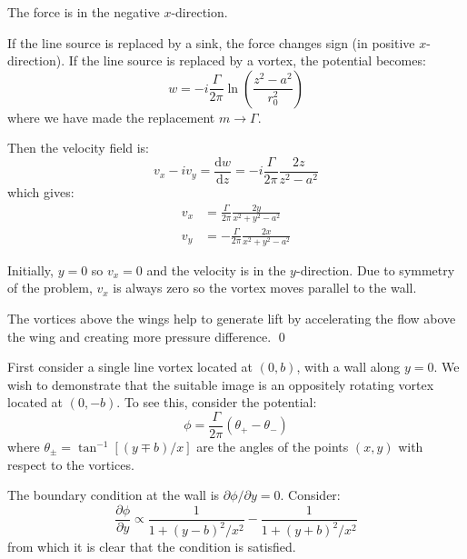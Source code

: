 \documentclass[12pt]{article}
\begin{document}
The force is in the negative $x$-direction.

If the line source is replaced by a sink, the force changes sign (in positive $x$-direction). If the line source is replaced by a vortex, the potential becomes:
\begin{equation}
    w = -i \frac{\Gamma}{2\pi} \ln{\left( \frac{z^{2} - a^{2}}{r_{0}^{2}} \right)}
\end{equation}
where we have made the replacement $m \to \Gamma$.

Then the velocity field is:
\begin{equation}
    v_{x} - iv_{y} = \frac{\mathrm{d}w}{\mathrm{d}z} = -i \frac{\Gamma}{2\pi} \frac{2z}{z^{2} - a^{2}}
\end{equation}
which gives:
\begin{equation}
    \begin{split}
        v_{x} &= \frac{\Gamma}{2\pi} \frac{2y}{x^{2} + y^{2} - a^{2}} \\
        v_{y} &= -\frac{\Gamma}{2\pi} \frac{2x}{x^{2} + y^{2} - a^{2}}
    \end{split}
\end{equation}

Initially, $y = 0$ so $v_{x} = 0$ and the velocity is in the $y$-direction. Due to symmetry of the problem, $v_{x}$ is always zero so the vortex moves parallel to the wall.

The vortices above the wings help to generate lift by accelerating the flow above the wing and creating more pressure difference.
\qed



First consider a single line vortex located at $(0, b)$, with a wall along $y = 0$. We wish to demonstrate that the suitable image is an oppositely rotating vortex located at $(0, -b)$. To see this, consider the potential:
\begin{equation}
    \phi = \frac{\Gamma}{2\pi} (\theta_{+} - \theta_{-})
\end{equation}
where $\theta_{\pm} = \tan^{-1}{[(y \mp b)/x]}$ are the angles of the points $(x, y)$ with respect to the vortices.

The boundary condition at the wall is $\partial \phi/\partial y = 0$. Consider:
\begin{equation}
    \frac{\partial \phi}{\partial y} \propto \frac{1}{1 + (y - b)^{2}/x^{2}} - \frac{1}{1 + (y + b)^{2}/x^{2}}
\end{equation}
from which it is clear that the condition is satisfied.
\end{document}
